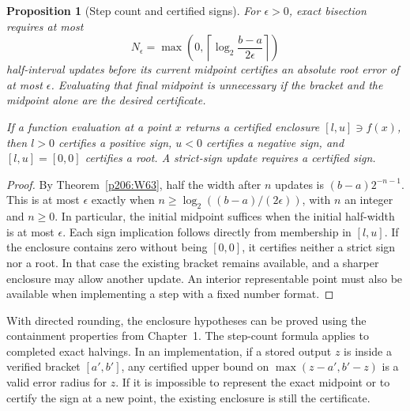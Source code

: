 \documentclass[11pt,oneside,openany]{book}
\theoremstyle{plain}
\newtheorem{proposition}[theorem]{Proposition}
\theoremstyle{definition}
\theoremstyle{remark}
\begin{document}
\begin{proposition}[Step count and certified signs]\label{p206:W64}
For \(\epsilon>0\), exact bisection requires at most
\[
 N_\epsilon=\max\left(0,\left\lceil
      \log_2\frac{b-a}{2\epsilon}\right\rceil\right)
\]
half-interval updates before its current midpoint certifies an absolute
root error of at most \(\epsilon\). Evaluating that final midpoint is
unnecessary if the bracket and the midpoint alone are the desired
certificate.

If a function evaluation at a point \(x\) returns a certified enclosure
\([l,u]\ni f(x)\), then \(l>0\) certifies a positive sign, \(u<0\)
certifies a negative sign, and \([l,u]=[0,0]\) certifies a root. A
strict-sign update requires a certified sign.
\end{proposition}
\begin{proof}
By Theorem~\ref{p206:W63}, half the width after \(n\) updates is
\((b-a)2^{-n-1}\). This is at most \(\epsilon\) exactly when
\(n\ge\log_2((b-a)/(2\epsilon))\), with \(n\) an integer and \(n\ge0\).
In particular, the initial midpoint suffices when the initial half-width
is at most \(\epsilon\). Each sign implication follows directly from
membership in \([l,u]\). If the enclosure contains zero without being
\([0,0]\), it certifies neither a strict sign nor a root. In that case
the existing bracket remains available, and a sharper enclosure may
allow another update. An interior representable point must also be
available when implementing a step with a fixed number format.
\end{proof}

With directed rounding, the enclosure hypotheses can be proved using
the containment properties from Chapter~1. The step-count formula
applies to completed exact halvings. In an implementation, if a stored
output \(z\) is inside a verified bracket \([a',b']\), any certified upper
bound on \(\max(z-a',b'-z)\) is a valid error radius for \(z\). If it
is impossible to represent the exact midpoint or to certify the sign at
a new point, the existing enclosure is still the certificate.
\end{document}
